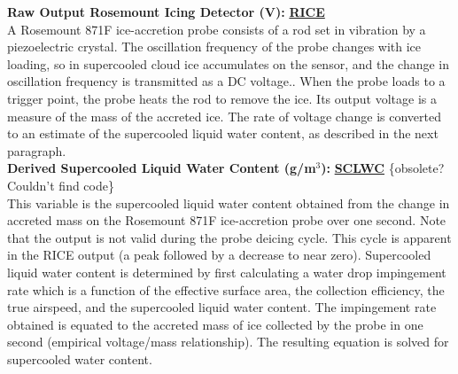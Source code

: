\begin{hangparagraphs}
\textbf{Raw Output Rosemount Icing Detector (V): }\textbf{\uline{RICE}}\\
A Rosemount 871F ice-accretion
probe consists of a rod set in vibration by a piezoelectric crystal.
The oscillation frequency of the probe changes with ice loading, so
in supercooled cloud ice accumulates on the sensor, and the change
in oscillation frequency is transmitted as a DC voltage.. When the
probe loads to a trigger point, the probe heats the rod to remove
the ice. Its output voltage is a measure of the mass of the accreted
ice. The rate of voltage change is converted to an estimate of the
supercooled liquid water content, as
described in the next paragraph. \\


\textbf{Derived Supercooled Liquid Water Content (g/m$^{3}$): }\textbf{\uline{SCLWC}}
\{obsolete? Couldn't find code\}\\
This variable is the supercooled liquid water content obtained from
the change in accreted mass on the Rosemount 871F ice-accretion probe
over one second. Note that the output is not valid during the probe
deicing cycle. This cycle is apparent in the RICE output (a peak followed
by a decrease to near zero). Supercooled liquid water content is determined
by first calculating a water drop impingement rate which is a function
of the effective surface area, the collection efficiency, the true
airspeed, and the supercooled liquid water content. The impingement
rate obtained is equated to the accreted mass of ice collected by
the probe in one second (empirical voltage/mass relationship). The
resulting equation is solved for supercooled water content.\\
\end{hangparagraphs}


